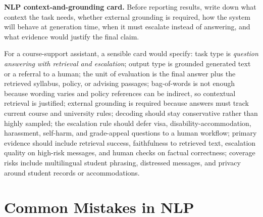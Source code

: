 \begin{thinkingtool}
\textbf{NLP context-and-grounding card.} Before reporting results, write down what context the task needs, whether external grounding is required, how the system will behave at generation time, when it must escalate instead of answering, and what evidence would justify the final claim.
\end{thinkingtool}

\begin{example}
For a course-support assistant, a sensible card would specify: task type is \emph{question answering with retrieval and escalation}; output type is grounded generated text or a referral to a human; the unit of evaluation is the final answer plus the retrieved syllabus, policy, or advising passages; bag-of-words is not enough because wording varies and policy references can be indirect, so contextual retrieval is justified; external grounding is required because answers must track current course and university rules; decoding should stay conservative rather than highly sampled; the escalation rule should defer visa, disability-accommodation, harassment, self-harm, and grade-appeal questions to a human workflow; primary evidence should include retrieval success, faithfulness to retrieved text, escalation quality on high-risk messages, and human checks on factual correctness; coverage risks include multilingual student phrasing, distressed messages, and privacy around student records or accommodations.
\end{example}

\section{Common Mistakes in NLP}

